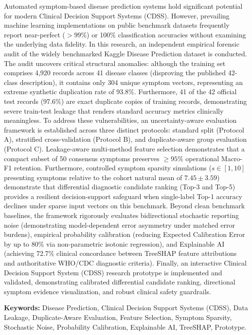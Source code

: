 Automated symptom-based disease prediction systems hold significant potential for modern Clinical Decision Support Systems (CDSS). However, prevailing machine learning implementations on public benchmark datasets frequently report near-perfect ($>99\%$) or 100\% classification accuracies without examining the underlying data fidelity. In this research, an independent empirical forensic audit of the widely benchmarked Kaggle Disease Prediction dataset is conducted. The audit uncovers critical structural anomalies: although the training set comprises 4,920 records across 41 disease classes (disproving the published 42-class description), it contains only 304 unique symptom vectors, representing an extreme synthetic duplication rate of 93.8\%. Furthermore, 41 of the 42 official test records (97.6\%) are exact duplicate copies of training records, demonstrating severe train-test leakage that renders standard accuracy metrics clinically meaningless. To address these vulnerabilities, an uncertainty-aware evaluation framework is established across three distinct protocols: standard split (Protocol A), stratified cross-validation (Protocol B), and duplicate-aware group evaluation (Protocol C). Leakage-aware multi-method feature selection demonstrates that a compact subset of 50 consensus symptoms preserves $\ge 95\%$ operational Macro-F1 retention. Furthermore, controlled symptom sparsity simulations ($s \in [1, 10]$ presenting symptoms relative to the cohort natural mean of $7.45 \pm 3.59$) demonstrate that differential diagnostic candidate ranking (Top-3 and Top-5) provides a resilient decision-support safeguard when single-label Top-1 accuracy declines under sparse input vectors on this benchmark. Beyond clean benchmark baselines, the framework rigorously evaluates bidirectional stochastic reporting noise (demonstrating model-dependent error asymmetry under matched error burdens), empirical probability calibration (reducing Expected Calibration Error by up to 80\% via non-parametric isotonic regression), and Explainable AI (achieving 72.7\% clinical concordance between TreeSHAP feature attributions and authoritative WHO/CDC diagnostic criteria). Finally, an interactive Clinical Decision Support System (CDSS) research prototype is implemented and validated, demonstrating calibrated differential candidate ranking, directional symptom evidence visualization, and robust clinical safety guardrails.

\vspace{8pt}
\textbf{Keywords:} Disease Prediction, Clinical Decision Support Systems (CDSS), Data Leakage, Duplicate-Aware Evaluation, Feature Selection, Symptom Sparsity, Stochastic Noise, Probability Calibration, Explainable AI, TreeSHAP, Prototype.
